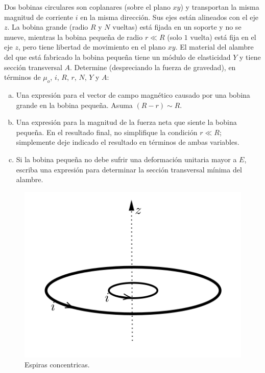 \begin{mdframed}[style=warning]
	\begin{ejercicio}
		Dos bobinas circulares son coplanares (sobre el plano $xy$) y transportan la misma magnitud de corriente $i$ en la misma dirección. Sus ejes están alineados con el eje $z$. La bobina grande (radio $R$ y $N$ vueltas) está fijada en un soporte y no se mueve, mientras la bobina pequeña de radio $r \ll R$ (solo $1$ vuelta) está fija en el eje $z$, pero tiene libertad de movimiento en el plano $xy$. El material del alambre del que está fabricado la bobina pequeña tiene un módulo de elasticidad $Y$ y tiene sección transversal $A$. Determine (despreciando la fuerza de gravedad), en términos de $\mu _o$, $i$, $R$, $r$, $N$, $Y$ y $A$:
		\begin{enumerate}[a)]
			\item Una expresión para el vector de campo magnético causado por una bobina grande en la bobina pequeña. Asuma $(R-r) \sim R$.
			\item Una expresión para la magnitud de la fuerza neta que siente la bobina pequeña. En el resultado final, no simplifique la condición $r \ll R$; simplemente deje indicado el resultado en términos de ambas variables.
			\item Si la bobina pequeña no debe sufrir una deformación unitaria mayor a $E$, escriba una expresión para determinar la sección transversal mínima del alambre.
		\end{enumerate}
		\begin{figure}[H]
			\centering
			\includegraphics[scale=0.5]{./img/p4.png}
			\caption{Espiras concentricas.}
			\label{DF}	
		\end{figure}
	\end{ejercicio}
\end{mdframed}


















